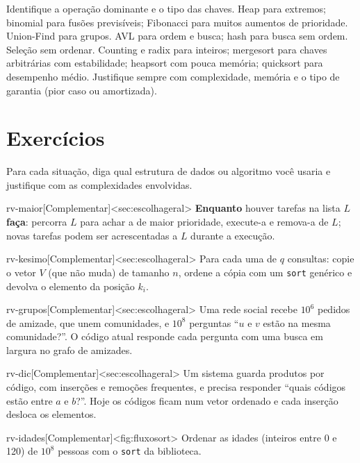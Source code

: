 \begin{chave}
Identifique a operação dominante e o tipo das chaves. Heap para extremos; binomial para fusões previsíveis; Fibonacci para muitos aumentos de prioridade. Union-Find para grupos. AVL para ordem e busca; hash para busca sem ordem. Seleção sem ordenar. Counting e radix para inteiros; mergesort para chaves arbitrárias com estabilidade; heapsort com pouca memória; quicksort para desempenho médio. Justifique sempre com complexidade, memória e o tipo de garantia (pior caso ou amortizada).
\end{chave}

\section{Exercícios}
Para cada situação, diga qual estrutura de dados ou algoritmo você usaria e justifique com as complexidades envolvidas.
\excompl
\begin{exercicio}{rv-maior}[Complementar]<sec:escolhageral>
\textbf{Enquanto} houver tarefas na lista $L$ \textbf{faça}: percorra $L$ para achar a de maior prioridade, execute-a e remova-a de $L$; novas tarefas podem ser acrescentadas a $L$ durante a execução.
\end{exercicio}
\begin{exercicio}{rv-kesimo}[Complementar]<sec:escolhageral>
Para cada uma de $q$ consultas: copie o vetor $V$ (que não muda) de tamanho $n$, ordene a cópia com um \texttt{sort} genérico e devolva o elemento da posição $k_i$.
\end{exercicio}
\begin{exercicio}{rv-grupos}[Complementar]<sec:escolhageral>
Uma rede social recebe $10^6$ pedidos de amizade, que unem comunidades, e $10^8$ perguntas ``$u$ e $v$ estão na mesma comunidade?''. O código atual responde cada pergunta com uma busca em largura no grafo de amizades.
\end{exercicio}
\begin{exercicio}{rv-dic}[Complementar]<sec:escolhageral>
Um sistema guarda produtos por código, com inserções e remoções frequentes, e precisa responder ``quais códigos estão entre $a$ e $b$?''. Hoje os códigos ficam num vetor ordenado e cada inserção desloca os elementos.
\end{exercicio}
\begin{exercicio}{rv-idades}[Complementar]<fig:fluxosort>
Ordenar as idades (inteiros entre 0 e 120) de $10^8$ pessoas com o \texttt{sort} da biblioteca.
\end{exercicio}
